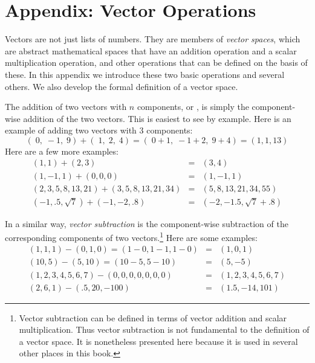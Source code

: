 \section{Appendix: Vector Operations}\label{S:LinearAlgebraAppendix}


Vectors are not just lists of numbers. They are members of \emph{vector spaces}, which are abstract mathematical spaces that have an addition operation and a scalar multiplication operation, and other operations that can be defined on the basis of these. In this appendix we introduce these two basic operations and several others. We also develop the formal definition of a vector space.
   
   The addition of two vectors with $n$ components, or , is simply the component-wise addition of the two vectors. This is easiest to see by example. Here is an example of adding two vectors with 3 components:
\begin{equation*}
      (\; 0,\; -1,\; 9) + (\; 1,\; 2,\; 4) 
  = (\; 0+1,\; -1+2,\; 9+4) = (1, 1, 13)
\end{equation*}
Here are a few more examples:
\begin{eqnarray*}
(1,1) + (2,3) &=& (3,4)  \\
(1,-1,1) + (0,0,0) &=& (1,-1,1)  \\
(2,3,5,8,13,21) + (3,5,8,13,21,34) &=& (5,8,13,21,34,55) \\
(-1,.5,\sqrt{7}) + (-1,-2,.8) &=& (-2,-1.5,\sqrt{7}+.8)
\end{eqnarray*}

In a similar way, \emph{vector subtraction} is the component-wise subtraction of the corresponding components of two vectors.\footnote{Vector subtraction can be defined in terms of vector addition and scalar multiplication. Thus vector subtraction is not fundamental to the definition of a vector space. It is nonetheless presented here because it is used in several other places in this book.}  Here are some examples:
\begin{eqnarray*}
(1,1,1) - (0,1,0) = (1-0,1-1,1-0) &=& (1,0,1) \\
(10,5) - (5,10) = (10-5,5-10) &=& (5,-5) \\
(1,2,3,4,5,6,7) - (0,0,0,0,0,0,0) &=& (1,2,3,4,5,6,7) \\
(2,6,1) - (.5,20,-100) &=& (1.5,-14,101)
\end{eqnarray*}

